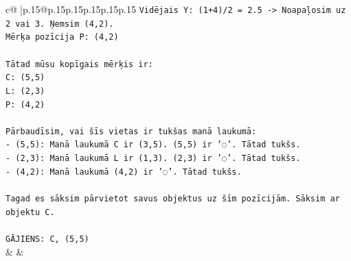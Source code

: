 \documentclass{article}
\begin{document}
{\begin{supertabular}{c@{$\;$}|p{.15\linewidth}@{}p{.15\linewidth}p{.15\linewidth}p{.15\linewidth}p{.15\linewidth}p{.15\linewidth}}
{{{\texttt{Vidējais Y: (1+4)/2 = 2.5 {-}> Noapaļosim uz 2 vai 3. Ņemsim (4,2).} \\
\texttt{Mērķa pozīcija P: (4,2)} \\
\\ 
\texttt{Tātad mūsu kopīgais mērķis ir:} \\
\texttt{C: (5,5)} \\
\texttt{L: (2,3)} \\
\texttt{P: (4,2)} \\
\\ 
\texttt{Pārbaudīsim, vai šīs vietas ir tukšas manā laukumā:} \\
\texttt{{-} (5,5): Manā laukumā C ir (3,5). (5,5) ir '◌'. Tātad tukšs.} \\
\texttt{{-} (2,3): Manā laukumā L ir (1,3). (2,3) ir '◌'. Tātad tukšs.} \\
\texttt{{-} (4,2): Manā laukumā (4,2) ir '◌'. Tātad tukšs.} \\
\\ 
\texttt{Tagad es sāksim pārvietot savus objektus uz šīm pozīcijām. Sāksim ar objektu C.} \\
\\ 
\texttt{GĀJIENS: C, (5,5)} \\
            }
        }
    }
    & & \\ \\


\end{supertabular}}
\end{document}
